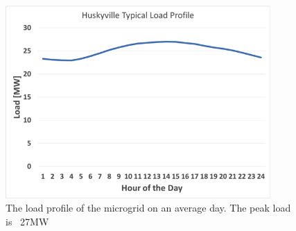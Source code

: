 \documentclass[a4paper]{article}
\begin{document}
\begin{figure}[h!]
\centering
\includegraphics[width=0.9\textwidth, height=0.15 \textheight]{LoadProfile.png}
\caption{\label{fig:LoadProfiles} The load profile of the microgrid on an average day. The peak load is ~27MW}
\end{figure}



\begin{table}
\label{tab:BusLoads}
\centering
{}
\caption{Typical average daily peak loads of each individual unit. A complete load profile for each hour of the year is available in Appendix A}
\end{table}
\end{document}
